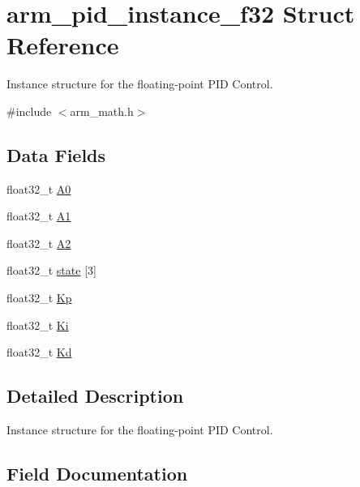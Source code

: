 \hypertarget{structarm__pid__instance__f32}{}\section{arm\+\_\+pid\+\_\+instance\+\_\+f32 Struct Reference}
\label{structarm__pid__instance__f32}


Instance structure for the floating-\/point P\+ID Control.  




{\ttfamily \#include $<$arm\+\_\+math.\+h$>$}

\subsection*{Data Fields}
\begin{DoxyCompactItemize}
\item 
float32\+\_\+t \mbox{\hyperlink{structarm__pid__instance__f32_afc2ed2bf70b7d9d84f49ee9ae7caa004}{A0}}
\item 
float32\+\_\+t \mbox{\hyperlink{structarm__pid__instance__f32_a5e6785a3a5cf7b98f3bfc7b180d98273}{A1}}
\item 
float32\+\_\+t \mbox{\hyperlink{structarm__pid__instance__f32_a5b00947275caf079f351271bf41573fe}{A2}}
\item 
float32\+\_\+t \mbox{\hyperlink{structarm__pid__instance__f32_a473556ac6100fc188e77930d56f51062}{state}} \mbox{[}3\mbox{]}
\item 
float32\+\_\+t \mbox{\hyperlink{structarm__pid__instance__f32_abe23f3e122ef5f55398fcf77c793c425}{Kp}}
\item 
float32\+\_\+t \mbox{\hyperlink{structarm__pid__instance__f32_ad1a1aa1c10a2dca201a3422f82198777}{Ki}}
\item 
float32\+\_\+t \mbox{\hyperlink{structarm__pid__instance__f32_ace6b9e405a991cbaf6b4c137ca0d51a3}{Kd}}
\end{DoxyCompactItemize}


\subsection{Detailed Description}
Instance structure for the floating-\/point P\+ID Control. 

\subsection{Field Documentation}
\mbox{\label{structarm__pid__instance__f32_afc2ed2bf70b7d9d84f49ee9ae7caa004}} 
